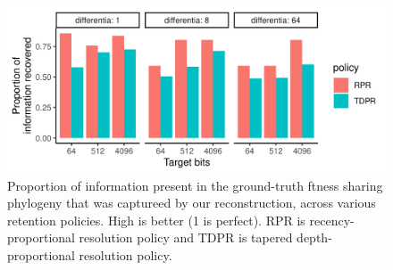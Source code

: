 \begin{figure}
    \includegraphics[width=\columnwidth]{img/info_plot}
    \caption{
    Proportion of information present in the ground-truth ftness sharing phylogeny that was captureed by our reconstruction, across various retention policies.
    High is better (1 is perfect).
    RPR is recency-proportional resolution policy and TDPR is tapered depth-proportional resolution policy.
    } \label{fig:info_plot}
\end{figure}